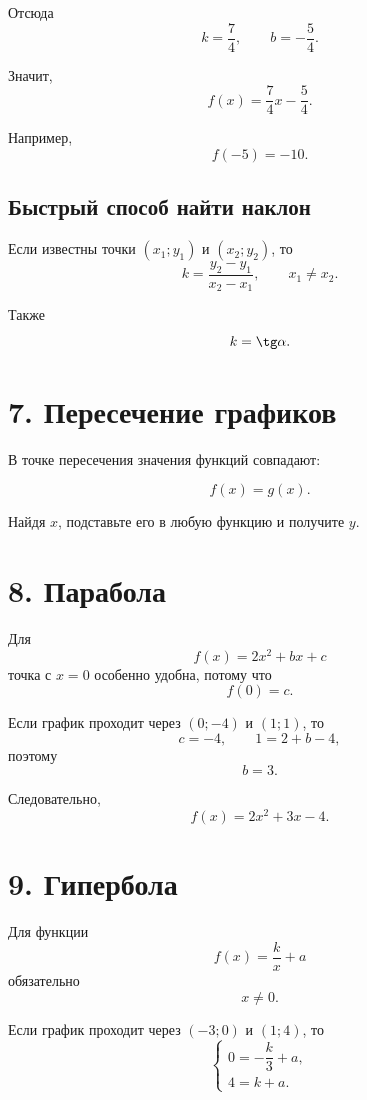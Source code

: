 \documentclass[a4paper,12pt]{article}
\newcommand{\sepLine}{\par\vspace{2mm}{\color{lightaccent}\rule{\linewidth}{0.8pt}}\vspace{2mm}}
\begin{document}
Отсюда
\[
k=\frac74,
\qquad
b=-\frac54.
\]

Значит,
\[
\boxed{f(x)=\frac74x-\frac54}.
\]

Например,
\[
\boxed{f(-5)=-10}.
\]

\subsection*{Быстрый способ найти наклон}

Если известны точки $(x_1;y_1)$ и $(x_2;y_2)$, то
\[
\boxed{k=\frac{y_2-y_1}{x_2-x_1}},
\qquad x_1\ne x_2.
\]

Также
\[
k=\tg\alpha.
\]

\sepLine

\section*{\textcolor{darkaccent}{7. Пересечение графиков}}

В точке пересечения значения функций совпадают:

\[
\boxed{f(x)=g(x)}.
\]

Найдя $x$, подставьте его в любую функцию и получите $y$.

\sepLine

\section*{\textcolor{darkaccent}{8. Парабола}}

Для
\[
f(x)=2x^2+bx+c
\]
точка с $x=0$ особенно удобна, потому что
\[
f(0)=c.
\]

Если график проходит через $(0;-4)$ и $(1;1)$, то
\[
c=-4,
\qquad
1=2+b-4,
\]
поэтому
\[
b=3.
\]

Следовательно,
\[
\boxed{f(x)=2x^2+3x-4}.
\]

\sepLine

\section*{\textcolor{darkaccent}{9. Гипербола}}

Для функции
\[
f(x)=\frac{k}{x}+a
\]
обязательно
\[
\boxed{x\ne0}.
\]

Если график проходит через $(-3;0)$ и $(1;4)$, то
\[
\begin{cases}
0=-\dfrac{k}{3}+a,\\
4=k+a.
\end{cases}
\]
\end{document}
